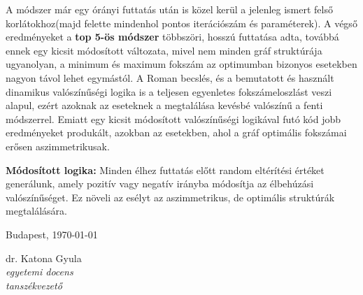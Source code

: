\documentclass[12pt,a4paper]{article}
\begin{document}
A módszer már egy órányi futtatás után is közel kerül a jelenleg ismert felső korlátokhoz(majd felette mindenhol pontos iterációszám és paraméterek). A végső eredményeket a \textbf{top 5-ös módszer} többszöri, hosszú futtatása adta, továbbá ennek egy kicsit módosított változata, mivel nem minden gráf struktúrája ugyanolyan, a minimum és maximum fokszám az optimumban bizonyos esetekben nagyon távol lehet egymástól. A Roman becslés, és a bemutatott és használt dinamikus valószínűségi logika is a teljesen egyenletes fokszámeloszlást veszi alapul, ezért azoknak az eseteknek a megtalálása kevésbé valószínű a fenti módszerrel.
Emiatt egy kicsit módosított valószínűségi logikával futó kód jobb eredményeket produkált, azokban az esetekben, ahol a gráf optimális fokszámai erősen aszimmetrikusak.

\textbf{Módosított logika:} Minden élhez futtatás előtt random eltérítési értéket generálunk, amely pozitív vagy negatív irányba módosítja az élbehúzási valószínűséget. Ez növeli az esélyt az aszimmetrikus, de optimális struktúrák megtalálására.

\vspace{1cm}\vfill
Budapest, \today
\begin{flushright}
\begin{minipage}{0.5\textwidth}
\begin{center}
	dr. Katona Gyula\\
	\textit{egyetemi docens}\\
	\textit{tanszékvezető}
\end{center}
\end{minipage}
\end{flushright}
\vfill
\end{document}
